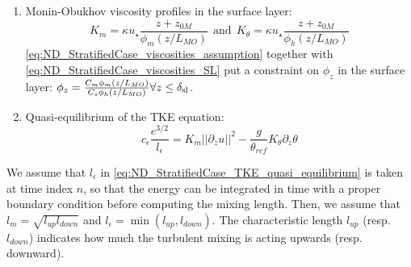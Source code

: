 \begin{enumerate}
\item
	Monin-Obukhov viscosity profiles in the surface layer:
\begin{equation}
	\label{eq:ND_StratifiedCase_viscosities_SL}
	K_m = \kappa u_\star\frac{z+ z_{0M}}{\phi_m(z/L_{MO})} ~~\text{and}~~
K_\theta = \kappa u_\star\frac{z+ z_{0M}}{\phi_h(z/L_{MO})}
\end{equation}
\eqref{eq:ND_StratifiedCase_viscosities_assumption}
together with \eqref{eq:ND_StratifiedCase_viscosities_SL} put
a constraint on $\phi_z$ in the surface layer:
$\phi_z = \frac{C_m\phi_m(z/L_{MO})}{C_s\phi_h(z/L_{MO})}
		\forall z\leq \delta_{\rm sl}$.
\item Quasi-equilibrium of the TKE equation:
\begin{equation}
	\label{eq:ND_StratifiedCase_TKE_quasi_equilibrium}
	c_\epsilon \frac{e^{3/2}}{l_\epsilon}=K_m ||\partial_z u||^2 - \frac{g}{\theta_{ref}} K_\theta \partial_z \theta
\end{equation}
\end{enumerate}
We assume that $l_\epsilon$ in
\eqref{eq:ND_StratifiedCase_TKE_quasi_equilibrium} is taken at
time index $n$, so that the energy can be integrated in time
with a proper boundary condition before computing the mixing
length. Then, we assume that $l_m = \sqrt{l_{up}l_{down}}$ and
$l_\epsilon = \min(l_{up}, l_{down})$.
The characteristic length $l_{up}$ (resp. $l_{down}$) indicates
how much the turbulent mixing is acting upwards (resp. downward).
